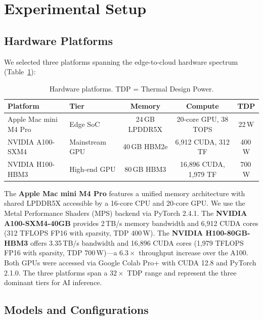 \documentclass[acmlarge,manuscript,screen,review]{acmart}
\begin{document}
\section{Experimental Setup}
\label{sec:setup}

\subsection{Hardware Platforms}

We selected three platforms spanning the edge-to-cloud hardware spectrum (Table~\ref{tab:hardware}):

\begin{table}[t]
\centering
\caption{Hardware platforms. TDP = Thermal Design Power.}
\label{tab:hardware}
\small
\begin{tabular}{@{}llccc@{}}
\toprule
\textbf{Platform} & \textbf{Tier} & \textbf{Memory} & \textbf{Compute} & \textbf{TDP} \\
\midrule
Apple Mac mini M4 Pro & Edge SoC & 24\,GB LPDDR5X & 20-core GPU, 38 TOPS & 22\,W \\
NVIDIA A100-SXM4 & Mainstream GPU & 40\,GB HBM2e & 6,912 CUDA, 312 TF & 400\,W \\
NVIDIA H100-HBM3 & High-end GPU & 80\,GB HBM3 & 16,896 CUDA, 1,979 TF & 700\,W \\
\bottomrule
\end{tabular}
\end{table}

The \textbf{Apple Mac mini M4 Pro} features a unified memory architecture with shared LPDDR5X accessible by a 16-core CPU and 20-core GPU. We use the Metal Performance Shaders (MPS) backend via PyTorch 2.4.1.
The \textbf{NVIDIA A100-SXM4-40GB} provides 2\,TB/s memory bandwidth and 6,912 CUDA cores (312 TFLOPS FP16 with sparsity, TDP 400\,W).
The \textbf{NVIDIA H100-80GB-HBM3} offers 3.35\,TB/s bandwidth and 16,896 CUDA cores (1,979 TFLOPS FP16 with sparsity, TDP 700\,W)---a $6.3\times$ throughput increase over the A100.
Both GPUs were accessed via Google Colab Pro+ with CUDA 12.8 and PyTorch 2.1.0.
The three platforms span a $32\times$ TDP range and represent the three dominant tiers for AI inference.

\subsection{Models and Configurations}
\end{document}
